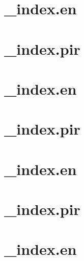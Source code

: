 \let\mypdfximage\pdfximage\def\pdfximage{\immediate\mypdfximage}\documentclass[twoside]{book}
\newcommand{\+}{\discretionary{\mbox{\scriptsize$\hookleftarrow$}}{}{}}
\begin{document}
\chapter{\+\_\+index.\+en}
\label{md_themes_relearn_exampleSite_content__index_en}

\chapter{\+\_\+index.\+pir}
\label{md_themes_relearn_exampleSite_content__index_pir}

\chapter{\+\_\+index.\+en}
\label{md_themes_relearn_exampleSite_content_basics__index_en}

\chapter{\+\_\+index.\+pir}
\label{md_themes_relearn_exampleSite_content_basics__index_pir}

\chapter{\+\_\+index.\+en}
\label{md_themes_relearn_exampleSite_content_basics_branding__index_en}

\chapter{\+\_\+index.\+pir}
\label{md_themes_relearn_exampleSite_content_basics_branding__index_pir}

\chapter{\+\_\+index.\+en}
\label{md_themes_relearn_exampleSite_content_basics_configuration__index_en}

\end{document}
